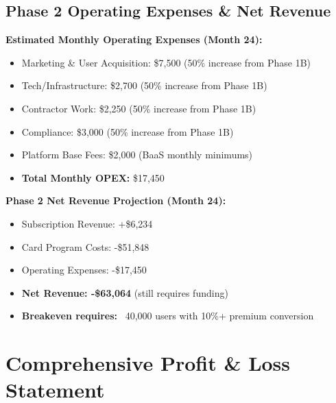 \documentclass[11pt,letterpaper]{article}
\begin{document}
\subsection{Phase 2 Operating Expenses \& Net Revenue}

\textbf{Estimated Monthly Operating Expenses (Month 24):}
\begin{itemize}
\item Marketing \& User Acquisition: \$7,500 (50\% increase from Phase 1B)
\item Tech/Infrastructure: \$2,700 (50\% increase from Phase 1B)
\item Contractor Work: \$2,250 (50\% increase from Phase 1B)
\item Compliance: \$3,000 (50\% increase from Phase 1B)
\item Platform Base Fees: \$2,000 (BaaS monthly minimums)
\item \textbf{Total Monthly OPEX:} \$17,450
\end{itemize}

\textbf{Phase 2 Net Revenue Projection (Month 24):}
\begin{itemize}
\item Subscription Revenue: +\$6,234
\item Card Program Costs: -\$51,848
\item Operating Expenses: -\$17,450
\item \textbf{Net Revenue: -\$63,064} (still requires funding)
\item \textbf{Breakeven requires:} ~40,000 users with 10\%+ premium conversion
\end{itemize}

\newpage

\newpage
\section{Comprehensive Profit \& Loss Statement}
\end{document}
